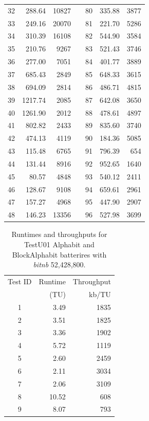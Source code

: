 \documentclass[
  digital,     %
  oneside,     %
  nosansbold,  %
  nocolorbold, %
  nolof,         %
  nolot,         %
]{fithesis4}
\begin{document}
\begin{longtable}[c]{c|r|rcc|r|r}
32 & 288.64 & 10827 &  & 80 & 335.88 & 3877\\
33 & 249.16 & 20070 &  & 81 & 221.70 & 5286\\
34 & 310.39 & 16108 &  & 82 & 544.90 & 3584\\
35 & 210.76 & 9267 &  & 83 & 521.43 & 3746\\
36 & 277.00 & 7051 &  & 84 & 401.77 & 3889\\
37 & 685.43 & 2849 &  & 85 & 648.33 & 3615\\
38 & 694.09 & 2814 &  & 86 & 486.71 & 4815\\
39 & 1217.74 & 2085 &  & 87 & 642.08 & 3650\\
40 & 1261.90 & 2012 &  & 88 & 478.61 & 4897\\
41 & 802.82 & 2433 &  & 89 & 835.60 & 3740\\
42 & 474.13 & 4119 &  & 90 & 184.36 & 5085\\
43 & 115.48 & 6765 &  & 91 & 796.39 & 654\\
44 & 131.44 & 8916 &  & 92 & 952.65 & 1640\\
45 & 80.57 & 4848 &  & 93 & 540.12 & 2411\\
46 & 128.67 & 9108 &  & 94 & 659.61 & 2961\\
47 & 157.27 & 4968 &  & 95 & 447.90 & 2907\\
48 & 146.23 & 13356 &  & 96 & 527.98 & 3699\\

 \end{longtable}


 \begin{table}[H]
  \begin{tabularx}{0.5\textwidth}{c|r|r}
  Test ID & Runtime & Throughput \\
         & (TU) &  kb/TU\\
  \midrule
        1 & 3.49 & 1835 \\
        2 & 3.51 & 1825 \\
        3 & 3.36 & 1902 \\
        4 & 5.72 & 1119 \\
        5 & 2.60 & 2459 \\
        6 & 2.11 & 3034 \\
        7 & 2.06 & 3109 \\
        8 & 10.52 & 608 \\
        9 & 8.07 & 793 \\
  \end{tabularx}
  \caption{Runtimes and throughputs for TestU01 Alphabit and BlockAlphabit batterires with \emph{bit\textunderscore nb} 52,428,800.}
  \label{tab:analysis_alphabit_time}
\end{table}
\end{document}
